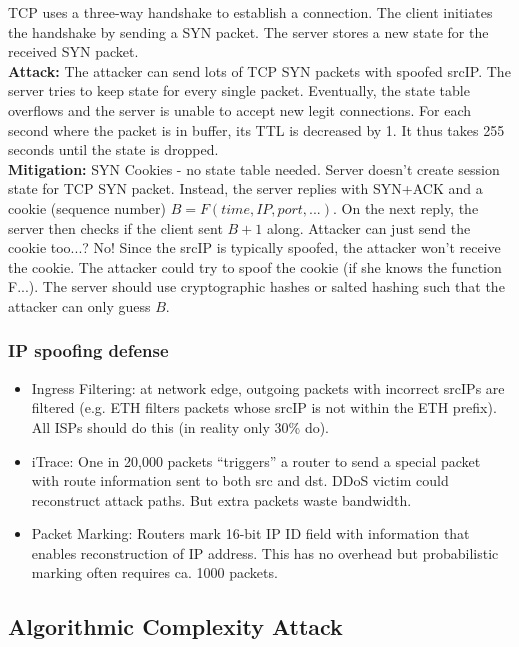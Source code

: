 \documentclass[11pt,oneside,a4paper]{article}
\begin{document}
TCP uses a three-way handshake to establish a connection. The client initiates the handshake by sending a SYN packet. The server stores a new state for the received SYN packet.\\
\textbf{Attack:} The attacker can send lots of TCP SYN packets with spoofed srcIP. The server tries to keep state for every single packet. Eventually, the state table overflows and the server is unable to accept new legit connections. For each second where the packet is in buffer, its TTL is decreased by 1. It thus takes 255 seconds until the state is dropped.\\
\textbf{Mitigation:} SYN Cookies - no state table needed. Server doesn't create session state for TCP SYN packet. Instead, the server replies with SYN+ACK and a cookie (sequence number) $B=F(time,IP,port,...)$. On the next reply, the server then checks if the client sent $B+1$ along. Attacker can just send the cookie too...? No! Since the srcIP is typically spoofed, the attacker won't receive the cookie. The attacker could try to spoof the cookie (if she knows the function F...). The server should use cryptographic hashes or salted hashing such that the attacker can only guess $B$.

\subsubsection{IP spoofing defense}
\label{ip_spoofing_defense}

\vspace{-\topsep}
\begin{itemize}
	\setlength{\itemsep}{0pt}
	\setlength{\parskip}{0pt}
	\item Ingress Filtering: at network edge, outgoing packets with incorrect srcIPs are filtered (e.g. ETH filters packets whose srcIP is not within the ETH prefix). All ISPs should do this (in reality only 30\% do).
	\item iTrace: One in 20,000 packets “triggers” a router to send a special packet with route information sent to both src and dst. DDoS victim could reconstruct attack paths. But extra packets waste bandwidth.
	\item Packet Marking: Routers mark 16-bit IP ID field with information that enables reconstruction of IP address. This has no overhead but probabilistic marking often requires ca. 1000 packets.
\end{itemize}
\vspace{-\topsep}

\subsection{Algorithmic Complexity Attack}
\end{document}
